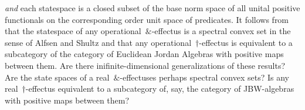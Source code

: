 \documentclass[b]{subfiles}
\begin{document}
\begin{parsec}
\begin{point}
\begin{point}
        \emph{and} each statespace is a closed subset
        of the base norm space of all
        unital positive functionals on the corresponding
        order unit space of predicates.
It follows from \cite{wetering}
    that the statespace of any operational~$\&$-effectus
    is a spectral convex set in the sense of Alfsen and Shultz
    and that any operational~$\dagger$-effectus
    is equivalent to a subcategory of the category of Euclidean Jordan Algebras
    with positive maps between them.
Are there inifinite-dimensional generalizations of these results?
Are the state spaces of a real~$\&$-effectuses perhaps
    spectral convex sets?
Is any real~$\dagger$-effectus equivalent to a subcategory of, say,
    the category of JBW-algebras with positive maps between them?
\end{point}
\end{point}
\end{parsec}
\end{document}
